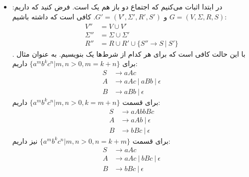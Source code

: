 \subsection{}
\begin{itemize}
    \item در ابتدا اثبات می‌کنیم که اجتماع دو
    باز هم یک
    است. فرض کنید که داریم:
    $G = (V, \Sigma, R, S)$ و $G' = (V', \Sigma', R', S')$.
    کافی است که داشته باشیم:
    \begin{align*}
        V'' &= V \cup V'\\
        \Sigma'' &= \Sigma \cup \Sigma'\\
        R'' &= R \cup R' \cup \{S'' \rightarrow S ~|~ S'\}
    \end{align*}.
    با این حالت کافی است که برای هر کدام از شرط‌ها یک
    بنویسیم. به عنوان مثال برای
    $\{a^mb^kc^n | m,n > 0, m = k + n\}$
    داریم:
    \begin{align*}
        S &\rightarrow aAc\\
        A &\rightarrow aAc ~|~ aBb ~|~ \epsilon\\
        B &\rightarrow aBb ~|~ \epsilon
    \end{align*}
    برای قسمت
    $\{a^mb^kc^n | m,n > 0, k = m + n\}$
    داریم:
    \begin{align*}
        S &\rightarrow aAbbBc\\
        A &\rightarrow aAb ~|~ \epsilon\\
        B &\rightarrow bBc ~|~ \epsilon
    \end{align*}
    برای قسمت
    $\{a^mb^kc^n | m,n > 0, n = k + m\}$
    نیز داریم:
    \begin{align*}
        S &\rightarrow aAc\\
        A &\rightarrow aAc ~|~ bBc ~|~ \epsilon\\
        B &\rightarrow bBc ~|~ \epsilon
    \end{align*}
\end{itemize}